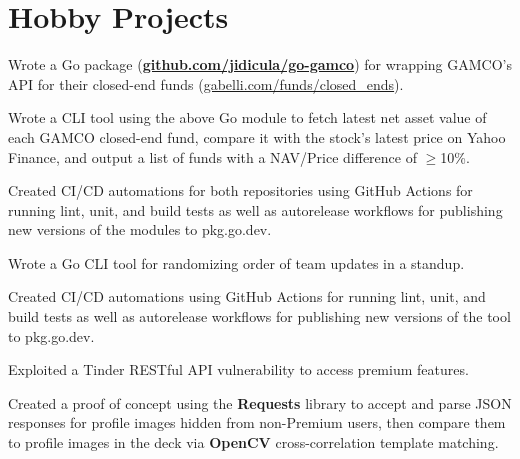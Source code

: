 \documentclass[]{jidicula-resume}
\begin{document}
\section{Hobby Projects}

\begin{tightemize}
\item Wrote a Go package (\href{https://github.com/jidicula/go-gamco}{\bf github.com/jidicula/go-gamco}) for wrapping GAMCO's API for their closed-end funds (\href{https://gabelli.com/funds/closed_ends}{gabelli.com/funds/closed\_ends}).
\item Wrote a CLI tool using the above Go module to fetch latest net asset value of each GAMCO closed-end fund, compare it with the stock's latest price on Yahoo Finance, and output a list of funds with a NAV/Price difference of $\ge$10\%.
\item Created CI/CD automations for both repositories using GitHub Actions for running lint, unit, and build tests as well as autorelease workflows for publishing new versions of the modules to pkg.go.dev.
\end{tightemize}
\sectionsep{}

\begin{tightemize}
\item Wrote a Go CLI tool for randomizing order of team updates in a standup.
\item Created CI/CD automations using GitHub Actions for running lint, unit, and build tests as well as autorelease workflows for publishing new versions of the tool to pkg.go.dev.
\end{tightemize}
\sectionsep{}

\begin{tightemize}
\item Exploited a Tinder RESTful API vulnerability to access premium features.
\item Created a proof of concept using the \textbf{Requests} library to accept and parse JSON responses for profile images hidden from non-Premium users, then compare them to profile images in the deck via \textbf{OpenCV} cross-correlation template matching.
\end{tightemize}
\sectionsep{}
\end{document}
